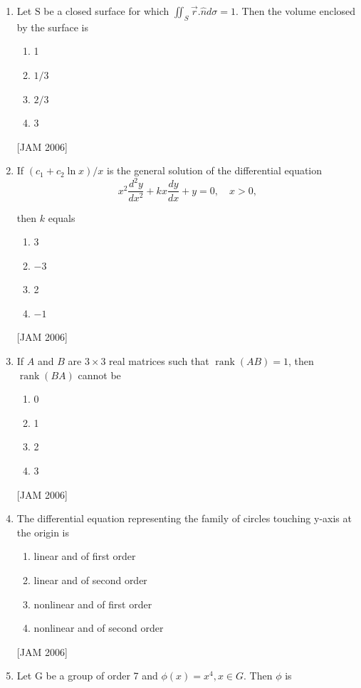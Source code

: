 \begin{enumerate}
  \item Let $\mathrm{S}$ be a closed surface for which $\iint_{S} \vec{r} . \hat{n} d \sigma=1$. Then the volume enclosed by the surface is
\begin{enumerate}
\item 1
\item $1 / 3$
\item $2 / 3$
\item 3
\end{enumerate}
 \hfill [JAM 2006]



\item  If $\left(c_{1}+c_{2} \ln x\right) / x$ is the general solution of the differential equation
$$
x^{2} \frac{d^{2} y}{d x^{2}}+k x \frac{d y}{d x}+y=0, \quad x>0,
$$

then $k$ equals
\begin{enumerate}
\item 3
\item $-3$
\item 2
\item $-1$
\end{enumerate}
 \hfill [JAM 2006]



 
  \item If $A$ and $B$ are $3 \times 3$ real matrices such that $\operatorname{rank}(A B)=1$, then $\operatorname{rank}(B A)$ cannot be
  \begin{enumerate}
\item 0
\item 1
\item 2
\item 3
\end{enumerate}
 \hfill [JAM 2006]



  \item The differential equation representing the family of circles touching y-axis at the origin is
  \begin{enumerate}
\item linear and of first order
\item linear and of second order
\item nonlinear and of first order
\item nonlinear and of second order
\end{enumerate}
 \hfill [JAM 2006]




  \item Let $\mathrm{G}$ be a group of order 7 and $\phi(x)=x^{4}, x \in G$. Then $\phi$ is


\end{enumerate}
